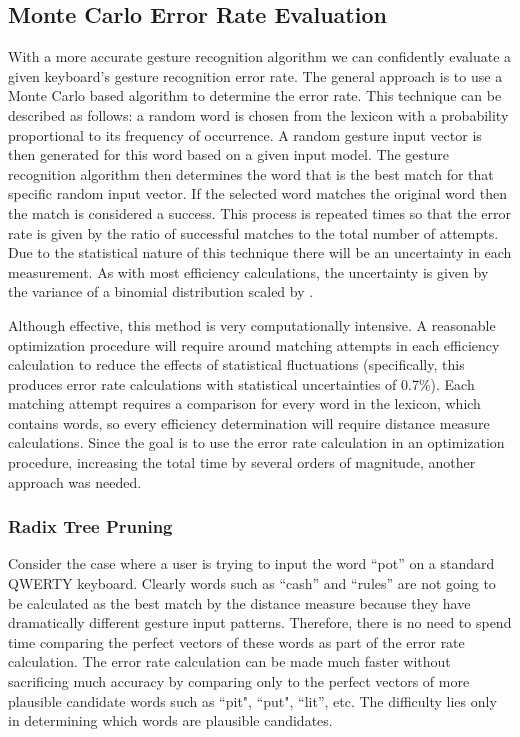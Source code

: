 \documentclass[final,1p,times,authoryear]{elsarticle}
\begin{document}
\subsection{Monte Carlo Error Rate Evaluation\label{sub:Error-Rate-Evaluation}}
With a more accurate gesture recognition algorithm we can confidently evaluate 
a given keyboard's gesture recognition error rate. The general approach is to use a Monte Carlo based algorithm to determine
the error rate. This technique can be described as follows: a random
word is chosen from the lexicon with a probability proportional
to its frequency of occurrence. A random gesture input vector is then
generated for this word based on a given input model. 
The gesture recognition algorithm then determines the word that is the
best match for that specific random input vector. If the selected word matches the original
word then the match is considered a success. This process is repeated
 times so that the error rate is given by the ratio of successful
matches to the total number of attempts. Due to the statistical nature
of this technique there will be an uncertainty in each measurement.
As with most efficiency calculations, the uncertainty is given by
the variance of a binomial distribution scaled by .

Although effective, this method is very computationally intensive.
A reasonable optimization procedure will require around  matching
attempts in each efficiency calculation to reduce the effects of statistical
fluctuations (specifically, this produces error rate calculations with statistical uncertainties of 0.7\%).
Each matching attempt requires a comparison for every
word in the lexicon, which contains  words, so every efficiency
determination will require  distance measure calculations.
Since the goal is to use the error rate calculation in an optimization
procedure, increasing the total time by several orders of magnitude,
another approach was needed.

\subsubsection{Radix Tree Pruning}
Consider the case where a user is trying to input the word ``pot''
on a standard QWERTY keyboard. Clearly words such as ``cash'' and
``rules'' are not going to be calculated as the best match by the
distance measure because they have dramatically different gesture input patterns.
Therefore, there is no need to spend time comparing the perfect vectors
of these words as part of the error rate calculation. The error rate
calculation can be made much faster without sacrificing much accuracy
by comparing only to the perfect vectors of more plausible candidate
words such as ``pit", ``put", ``lit'', etc. The difficulty lies only in determining which words
are plausible candidates.
\end{document}
